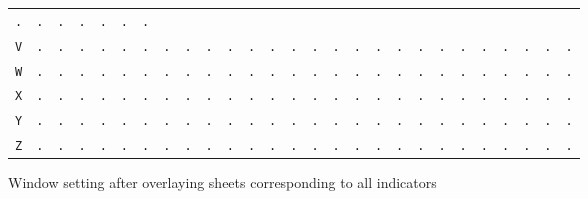 \begin{figure}[H]
\begin{center}
{\begin{tabular}{c|cccccccccccccccccccccccccc}
        \texttt{.} & \texttt{.} & \texttt{.} & \texttt{.} &
        \texttt{.} & \texttt{.} & \texttt{.}                             \\
        \texttt{V} & \texttt{.} & \texttt{.} & \texttt{.} &
        \texttt{.} & \texttt{.} & \texttt{.} & \texttt{.} &
        \texttt{.} & \texttt{.} & \texttt{.} & \texttt{.} &
        \texttt{.} & \texttt{.} & \texttt{.} & \texttt{.} &
        \texttt{.} & \texttt{.} & \texttt{.} & \texttt{.} &
        \texttt{.} & \texttt{.} & \texttt{.} & \texttt{.} &
        \texttt{.} & \texttt{.} & \texttt{.}                             \\
        \texttt{W} & \texttt{.} & \texttt{.} & \texttt{.} &
        \texttt{.} & \texttt{.} & \texttt{.} & \texttt{.} &
        \texttt{.} & \texttt{.} & \texttt{.} & \texttt{.} &
        \texttt{.} & \texttt{.} & \texttt{.} & \texttt{.} &
        \texttt{.} & \texttt{.} & \texttt{.} & \texttt{.} &
        \texttt{.} & \texttt{.} & \texttt{.} & \texttt{.} &
        \texttt{.} & \texttt{.} & \texttt{.}                             \\
        \texttt{X} & \texttt{.} & \texttt{.} & \texttt{.} &
        \texttt{.} & \texttt{.} & \texttt{.} & \texttt{.} &
        \texttt{.} & \texttt{.} & \texttt{.} & \texttt{.} &
        \texttt{.} & \texttt{.} & \texttt{.} & \texttt{.} &
        \texttt{.} & \texttt{.} & \texttt{.} & \texttt{.} &
        \texttt{.} & \texttt{.} & \texttt{.} & \texttt{.} &
        \texttt{.} & \texttt{.} & \texttt{.}                             \\
        \texttt{Y} & \texttt{.} & \texttt{.} & \texttt{.} &
        \texttt{.} & \texttt{.} & \texttt{.} & \texttt{.} &
        \texttt{.} & \texttt{.} & \texttt{.} & \texttt{.} &
        \texttt{.} & \texttt{.} & \texttt{.} & \texttt{.} &
        \texttt{.} & \texttt{.} & \texttt{.} & \texttt{.} &
        \texttt{.} & \texttt{.} & \texttt{.} & \texttt{.} &
        \texttt{.} & \texttt{.} & \texttt{.}                             \\
        \texttt{Z} & \texttt{.} & \texttt{.} & \texttt{.} &
        \texttt{.} & \texttt{.} & \texttt{.} & \texttt{.} &
        \texttt{.} & \texttt{.} & \texttt{.} & \texttt{.} &
        \texttt{.} & \texttt{.} & \texttt{.} & \texttt{.} &
        \texttt{.} & \texttt{.} & \texttt{.} & \texttt{.} &
        \texttt{.} & \texttt{.} & \texttt{.} & \texttt{.} &
        \texttt{.} & \texttt{.} & \texttt{.}                             \\
      \end{tabular}
    }
  \end{center}
  \caption{Window setting after overlaying sheets corresponding to
  all indicators}
\end{figure}
